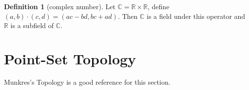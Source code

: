 \documentclass[12pt,a4paper]{book}
\newcommand{\bbrace}[1]{\left\{ #1 \right\} }
\newcommand{\bb}[1]{\mathbb{#1}}
\theoremstyle{definition}
\newtheorem{defn}{Definition}[section]
\begin{document}
\begin{defn}[complex number]
    Let $\bb{C}=\bb{R}\times \bb{R}$, define $(a,b)\cdot (c,d)=(ac-bd,bc+ad)$. Then $\bb{C}$ is a field under this operator and $\bb{R}$ is a subfield of $\bb{C}$.
\end{defn}



\newpage
\section{Point-Set Topology}
Munkres's Topology is a good reference for this section.
\end{document}

